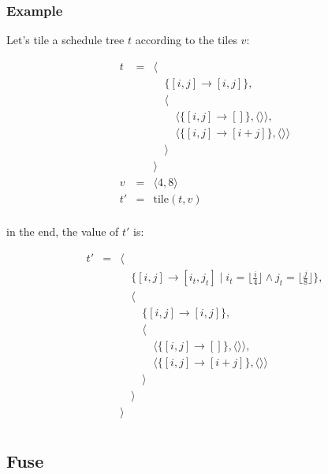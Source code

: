\documentclass{article}
\begin{document}
\subsubsection*{Example}

Let's tile a schedule tree $t$ according to the tiles $v$:

\[
    \begin{array}{lcl}
        t &=& \langle \\
          & & \quad\{[i,j] \rightarrow [i,j] \},\\
          & & \quad\langle \\
          & & \quad\quad \langle\{ [i,j] \rightarrow [] \}, \langle\rangle\rangle,\\
          & & \quad\quad \langle\{ [i,j] \rightarrow [i+j] \}, \langle\rangle\rangle\\
          & & \quad\rangle \\
          & & \rangle \\
        v &=& \langle 4, 8 \rangle\\
        t'&=& \mathrm{tile}(t, v) \\
    \end{array}
\]

\noindent in the end, the value of $t'$ is:

\[
    \begin{array}{lcl}
        t'&=& \langle \\
          & & \quad\{[i,j] \rightarrow [i_t,j_t] \mid i_t = \lfloor\frac{i}{4}\rfloor \wedge j_t = \lfloor \frac{j}{8} \rfloor\},\\
          & & \quad\langle \\
          & & \quad\quad\{ [i,j] \rightarrow [i,j] \},\\
          & & \quad\quad\langle \\
          & & \quad\quad\quad \langle\{ [i,j] \rightarrow [] \}, \langle\rangle\rangle,\\
          & & \quad\quad\quad  \langle\{ [i,j] \rightarrow [i+j] \}, \langle\rangle\rangle\\
          & & \quad\quad\rangle \\
          & & \quad\rangle \\
          & & \rangle \\
    \end{array}
\]

\subsection{Fuse}
\end{document}
